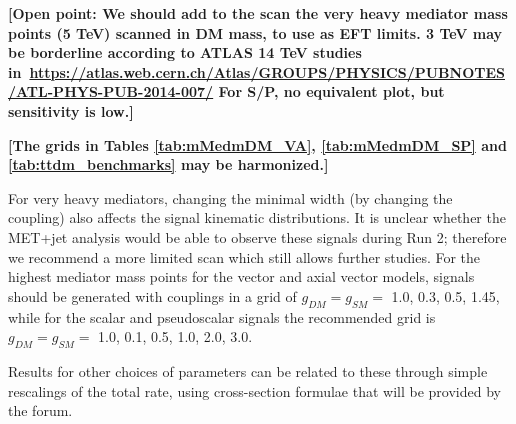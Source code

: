 \documentclass[debug,notitlepage]{dmfm}
\begin{document}
\textbf{[Open point: We should add to the scan 
the very heavy mediator mass points (5 TeV) scanned in DM mass, to use as EFT limits.  
3 TeV may be borderline according to ATLAS 14 TeV studies 
in~\url{https://atlas.web.cern.ch/Atlas/GROUPS/PHYSICS/PUBNOTES/ATL-PHYS-PUB-2014-007/}
For S/P, no equivalent plot, but sensitivity is low.]}




\textbf{[The grids in Tables \ref{tab:mMedmDM_VA}, \ref{tab:mMedmDM_SP} and 
\ref{tab:ttdm_benchmarks} may be harmonized.]}

For very heavy mediators, changing
the minimal width (by changing the coupling) also affects the signal
kinematic distributions. It is unclear whether the MET+jet analysis
would be able to observe these signals during Run 2; therefore we
recommend a more limited scan which still allows further studies.
For the highest mediator mass points for the vector and axial vector models, 
signals should be generated with couplings in a grid of $g_{DM} = g_{SM} = $ 1.0, 0.3, 0.5, 1.45,
while for the scalar and pseudoscalar signals the recommended grid is
$g_{DM} = g_{SM} = $ 1.0, 0.1, 0.5, 1.0, 2.0, 3.0.





Results for other choices of parameters can be related to
these through simple rescalings of the total rate, using cross-section
formulae that will be provided by the forum.
\end{document}
